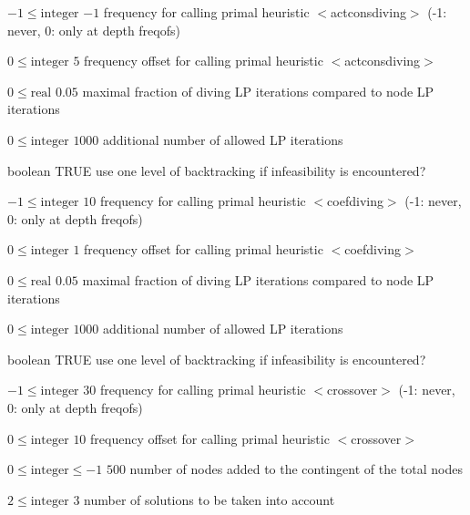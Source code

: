%
{$-1\leq\textrm{integer}$}%
{$-1$}%
{frequency for calling primal heuristic $<$actconsdiving$>$ (-1: never, 0: only at depth freqofs)}%
{}

%
{$0\leq\textrm{integer}$}%
{$5$}%
{frequency offset for calling primal heuristic $<$actconsdiving$>$}%
{}

%
{$0\leq\textrm{real}$}%
{$0.05$}%
{maximal fraction of diving LP iterations compared to node LP iterations}%
{}

%
{$0\leq\textrm{integer}$}%
{$1000$}%
{additional number of allowed LP iterations}%
{}

%
{boolean}%
{TRUE}%
{use one level of backtracking if infeasibility is encountered?}%
{}

%
{$-1\leq\textrm{integer}$}%
{$10$}%
{frequency for calling primal heuristic $<$coefdiving$>$ (-1: never, 0: only at depth freqofs)}%
{}

%
{$0\leq\textrm{integer}$}%
{$1$}%
{frequency offset for calling primal heuristic $<$coefdiving$>$}%
{}

%
{$0\leq\textrm{real}$}%
{$0.05$}%
{maximal fraction of diving LP iterations compared to node LP iterations}%
{}

%
{$0\leq\textrm{integer}$}%
{$1000$}%
{additional number of allowed LP iterations}%
{}

%
{boolean}%
{TRUE}%
{use one level of backtracking if infeasibility is encountered?}%
{}

%
{$-1\leq\textrm{integer}$}%
{$30$}%
{frequency for calling primal heuristic $<$crossover$>$ (-1: never, 0: only at depth freqofs)}%
{}

%
{$0\leq\textrm{integer}$}%
{$10$}%
{frequency offset for calling primal heuristic $<$crossover$>$}%
{}

%
{$0\leq\textrm{integer}\leq-1$}%
{$500$}%
{number of nodes added to the contingent of the total nodes}%
{}

%
{$2\leq\textrm{integer}$}%
{$3$}%
{number of solutions to be taken into account}%
{}

